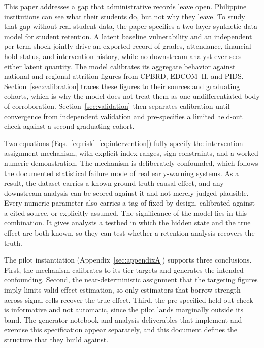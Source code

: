 \documentclass[11pt]{article}
\begin{document}
\hspace*{\parindent}This paper addresses a gap that administrative records leave open. Philippine institutions can see what their students do, but not why they leave. To study that gap without real student data, the paper specifies a two-layer synthetic data model for student retention. A latent baseline vulnerability and an independent per-term shock jointly drive an exported record of grades, attendance, financial-hold status, and intervention history, while no downstream analyst ever sees either latent quantity. The model calibrates its aggregate behavior against national and regional attrition figures from CPBRD, EDCOM~II, and PIDS. Section~\ref{sec:calibration} traces these figures to their sources and graduating cohorts, which is why the model does not treat them as one undifferentiated body of corroboration. Section~\ref{sec:validation} then separates calibration-until-convergence from independent validation and pre-specifies a limited held-out check against a second graduating cohort.

Two equations (Eqs.~\ref{eq:risk}--\ref{eq:intervention}) fully specify the intervention-assignment mechanism, with explicit index ranges, sign constraints, and a worked numeric demonstration. The mechanism is deliberately confounded, which follows the documented statistical failure mode of real early-warning systems. As a result, the dataset carries a known ground-truth causal effect, and any downstream analysis can be scored against it and not merely judged plausible. Every numeric parameter also carries a tag of fixed by design, calibrated against a cited source, or explicitly assumed. The significance of the model lies in this combination. It gives analysts a testbed in which the hidden state and the true effect are both known, so they can test whether a retention analysis recovers the truth.

The pilot instantiation (Appendix~\ref{sec:appendixA}) supports three conclusions. First, the mechanism calibrates to its tier targets and generates the intended confounding. Second, the near-deterministic assignment that the targeting figures imply limits valid effect estimation, so only estimators that borrow strength across signal cells recover the true effect. Third, the pre-specified held-out check is informative and not automatic, since the pilot lands marginally outside its band. The generator notebook and analysis deliverables that implement and exercise this specification appear separately, and this document defines the structure that they build against.
\end{document}
